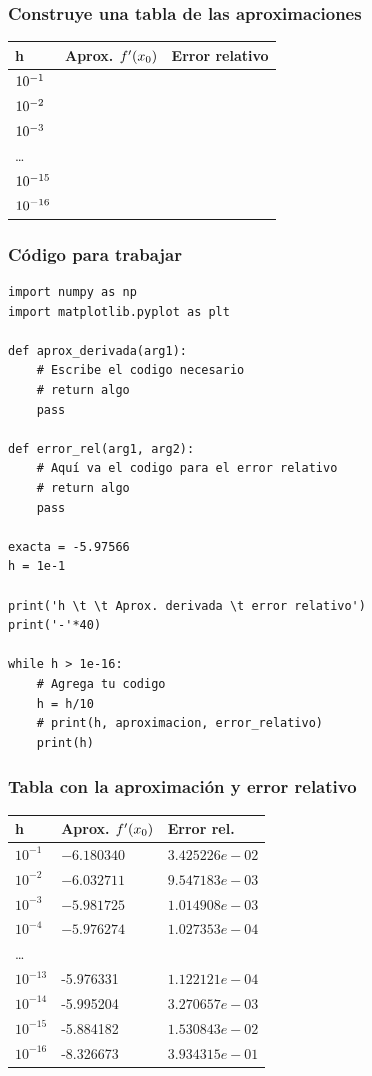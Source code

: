 \documentclass[12pt]{beamer}
\begin{document}
\begin{frame}
\frametitle{Construye una tabla de las aproximaciones}
\begin{table}
\renewcommand{\arraystretch}{0.9}
\centering
\begin{tabular}{l | l | l}
h & Aprox. ${f}^{\prime} (x_{0})$ & Error relativo\\ \hline
$\num{d-1}$ & & \\ \hline
$\num{d-2}$ & & \\ \hline
$\num{d-3}$ & & \\ \hline
\ldots & & \\ \hline
$\num{d-15}$ & & \\ \hline
$\num{d-16}$ & & \\ \hline
\end{tabular}
\end{table}
\end{frame}
\begin{frame}
\frametitle{Código para trabajar}
\begin{lstlisting}[caption=Código para la aproximación de la derivada]
import numpy as np
import matplotlib.pyplot as plt

def aprox_derivada(arg1):
    # Escribe el codigo necesario
    # return algo
    pass

def error_rel(arg1, arg2):
    # Aquí va el codigo para el error relativo
    # return algo
    pass

exacta = -5.97566
h = 1e-1

print('h \t \t Aprox. derivada \t error relativo')
print('-'*40)

while h > 1e-16:
    # Agrega tu codigo
    h = h/10
    # print(h, aproximacion, error_relativo)
    print(h)
\end{lstlisting}
\end{frame}
\begin{frame}[fragile]
\begin{table}
\frametitle{Tabla con la aproximación y error relativo}
\renewcommand{\arraystretch}{0.9}
\centering
\begin{tabular}{l | p{3.5cm} | p{3cm}}
h & Aprox. ${f}^{\prime} (x_{0})$ & Error rel. \\ \hline
$10^{-1}$ & $-6.180340$ & $3.425226e-02$ \\ \hline
$10^{-2}$ & $-6.032711$ & $9.547183e-03$ \\ \hline
$10^{-3}$ & $-5.981725$ & $1.014908e-03$ \\ \hline
$10^{-4}$ & $-5.976274$ & $1.027353e-04$ \\ \hline
\ldots & & \\ \hline
$10^{-13}$ & {-5.976331} & $1.122121e-04$ \\ \hline
$10^{-14}$ & {-5.995204} & $3.270657e-03$ \\ \hline
$10^{-15}$ & {-5.884182} & $1.530843e-02$ \\ \hline
$10^{-16}$ & {-8.326673} & $3.934315e-01$ \\ \hline
\end{tabular}
\end{table}
\end{frame}
\end{document}
